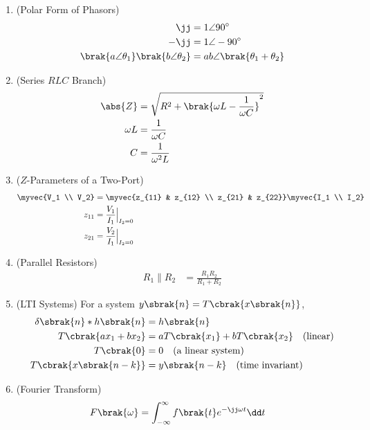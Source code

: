 \begin{enumerate}[label=\thesubsection.\arabic*, ref=\thesubsection.\theenumi, itemsep=0pt, leftmargin=0pt, labelwidth=0pt, itemindent=0pt, labelsep=1em, align=right]
\item (Polar Form of Phasors)
\begin{align}
\jj &= 1 \angle 90^\circ
\\
-\jj &= 1 \angle -90^\circ
\\
\brak{a \angle \theta_1}\brak{b \angle \theta_2} &= ab \angle \brak{\theta_1 + \theta_2}
\label{eq:F-polar}
\end{align}

\item (Series $RLC$ Branch)
\begin{align}
\abs{Z} &= \sqrt{R^2 + \brak{\omega L - \frac{1}{\omega C}}^2}
\label{eq:F-series-rlc}
\\
\omega L &= \frac{1}{\omega C}
\\
C &= \frac{1}{\omega^2 L}
\label{eq:F-resonance}
\end{align}

\item ($Z$-Parameters of a Two-Port)
\begin{align}
\myvec{V_1 \\ V_2} &= \myvec{z_{11} & z_{12} \\ z_{21} & z_{22}} \myvec{I_1 \\ I_2}
\label{eq:F-zdef}
\\
z_{11} &= \frac{V_1}{I_1}\Big|_{I_2 = 0}
\\
z_{21} &= \frac{V_2}{I_1}\Big|_{I_2 = 0}
\label{eq:F-zparam}
\end{align}

\item (Parallel Resistors)
\begin{align}
R_1 \parallel R_2 &= \frac{R_1 R_2}{R_1 + R_2}
\label{eq:F-rnet}
\end{align}

\item (LTI Systems) For a system $y\sbrak{n} = T\cbrak{x\sbrak{n}}$,
\begin{align}
\delta\sbrak{n} * h\sbrak{n} &= h\sbrak{n}
\label{eq:F-conv}
\\
T\cbrak{a x_1 + b x_2} &= a T\cbrak{x_1} + b T\cbrak{x_2} \quad \text{(linear)}
\label{eq:F-linear}
\\
T\cbrak{0} &= 0 \quad \text{(a linear system)}
\label{eq:F-zero}
\\
T\cbrak{x\sbrak{n - k}} &= y\sbrak{n - k} \quad \text{(time invariant)}
\label{eq:F-ti}
\end{align}

\item (Fourier Transform)
\begin{align}
F\brak{\omega} &= \int_{-\infty}^{\infty} f\brak{t} e^{-\jj \omega t} \dd t
\label{eq:F-ft}
\end{align}


\end{enumerate}
